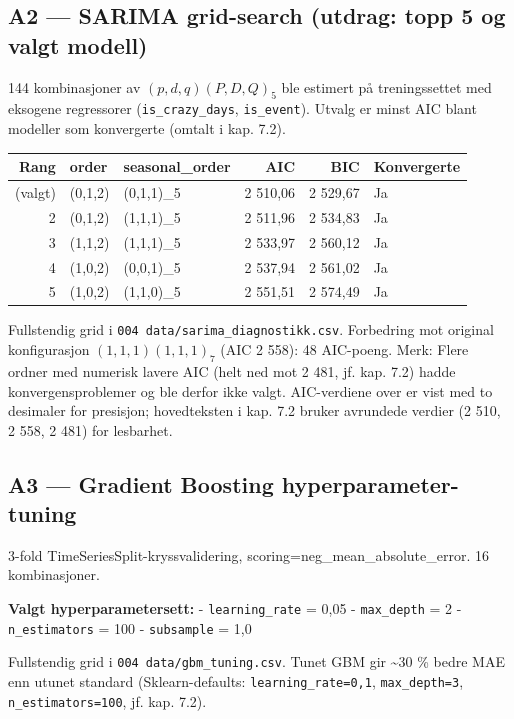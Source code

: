 \documentclass[
  norsk,
  11pt,
  a4paper,
]{article}
\newcounter{none} %
\begin{document}
\subsection{A2 --- SARIMA grid-search (utdrag: topp 5 og valgt
modell)}\label{a2-sarima-grid-search-utdrag-topp-5-og-valgt-modell}

144 kombinasjoner av \((p,d,q)(P,D,Q)_5\) ble estimert på treningssettet
med eksogene regressorer (\texttt{is\_crazy\_days}, \texttt{is\_event}).
Utvalg er minst AIC blant modeller som konvergerte (omtalt i kap. 7.2).

{\def\LTcaptype{none} %
\begin{longtable}[]{@{}rllrrl@{}}
\toprule\noalign{}
Rang & order & seasonal\_order & AIC & BIC & Konvergerte \\
\midrule\noalign{}
\endhead
\bottomrule\noalign{}
\endlastfoot
1 (valgt) & (0,1,2) & (0,1,1)\_5 & 2 510,06 & 2 529,67 & Ja \\
2 & (0,1,2) & (1,1,1)\_5 & 2 511,96 & 2 534,83 & Ja \\
3 & (1,1,2) & (1,1,1)\_5 & 2 533,97 & 2 560,12 & Ja \\
4 & (1,0,2) & (0,0,1)\_5 & 2 537,94 & 2 561,02 & Ja \\
5 & (1,0,2) & (1,1,0)\_5 & 2 551,51 & 2 574,49 & Ja \\
\end{longtable}
}

Fullstendig grid i \texttt{004\ data/sarima\_diagnostikk.csv}.
Forbedring mot original konfigurasjon \((1,1,1)(1,1,1)_7\) (AIC 2 558):
48 AIC-poeng. Merk: Flere ordner med numerisk lavere AIC (helt ned mot 2
481, jf. kap. 7.2) hadde konvergensproblemer og ble derfor ikke valgt.
AIC-verdiene over er vist med to desimaler for presisjon; hovedteksten i
kap. 7.2 bruker avrundede verdier (2 510, 2 558, 2 481) for lesbarhet.

\subsection{A3 --- Gradient Boosting
hyperparameter-tuning}\label{a3-gradient-boosting-hyperparameter-tuning}

3-fold TimeSeriesSplit-kryssvalidering,
scoring=neg\_mean\_absolute\_error. 16 kombinasjoner.

\textbf{Valgt hyperparametersett:} - \texttt{learning\_rate} = 0,05 -
\texttt{max\_depth} = 2 - \texttt{n\_estimators} = 100 -
\texttt{subsample} = 1,0

Fullstendig grid i \texttt{004\ data/gbm\_tuning.csv}. Tunet GBM gir
\textasciitilde30 \% bedre MAE enn utunet standard (Sklearn-defaults:
\texttt{learning\_rate=0,1}, \texttt{max\_depth=3},
\texttt{n\_estimators=100}, jf. kap. 7.2).
\end{document}
